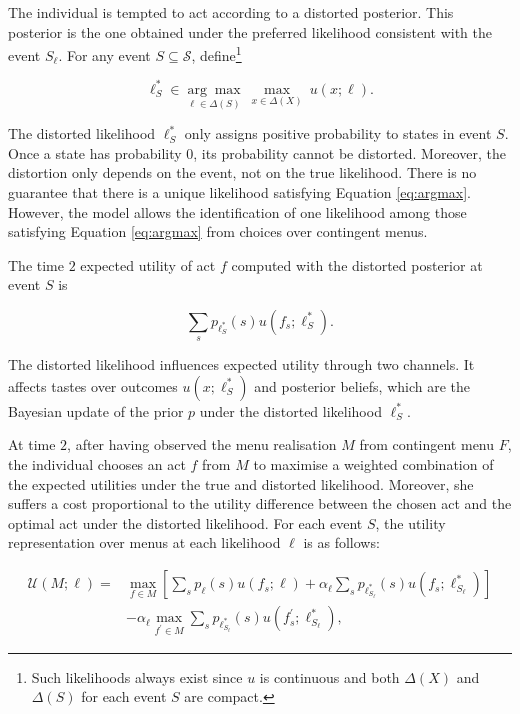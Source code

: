 The individual is tempted to act according to a distorted posterior. This posterior is the one obtained under the preferred likelihood consistent with the event \( S_{\ell} \). For any event \( S \subseteq \mathcal{S} \), define\footnote{Such likelihoods always exist since \( u \) is continuous and both \( \Delta \left( X \right) \) and \( \Delta \left( S \right) \) for each event \( S \) are compact.}

\begin{equation}\label{eq:argmax}
	\ell^{*}_{S} \in \underset{\ell \in \Delta \left( S \right)}{\arg \max} \: \max_{x \in \Delta \left( X \right)} \: u \left( x ; \ell \right) .
\end{equation}

The distorted likelihood \( \ell^{*}_{S} \) only assigns positive probability to states in event \( S \). Once a state has probability \( 0 \), its probability cannot be distorted. Moreover, the distortion only depends on the event, not on the true likelihood. There is no guarantee that there is a unique likelihood satisfying Equation \eqref{eq:argmax}. However, the model allows the identification of one likelihood among those satisfying Equation \eqref{eq:argmax} from choices over contingent menus.

The time \( 2 \) expected utility of act \( f \) computed with the distorted posterior at event \( S \) is

\[
	\sum_{s} p_{\ell^{*}_{S}} \left( s \right) u \left( f_{s} ; \ell^{*}_{S} \right) .
\]

The distorted likelihood influences expected utility through two channels. It affects tastes over outcomes \( u \left( x ; \ell^{*}_{S} \right) \) and posterior beliefs, which are the Bayesian update of the prior \( p \) under the distorted likelihood \( \ell^{*}_{S} \).

At time \( 2 \), after having observed the menu realisation \( M \) from contingent menu \( F \), the individual chooses an act \( f \) from \( M \) to maximise a weighted combination of the expected utilities under the true and distorted likelihood. Moreover, she suffers a cost proportional to the utility difference between the chosen act and the optimal act under the distorted likelihood. For each event \( S \), the utility representation over menus at each likelihood \( \ell \) is as follows:

\begin{equation}\label{eq:menu1}
	\begin{aligned}
		\mathcal{U} \left(M ; \ell \right) = & \max_{f \in M}\left[ \sum_{s} p_{\ell} \left( s \right) u \left( f_{s} ; \ell \right) +\alpha _{\ell} \sum_{s} p_{\ell^{*}_{S_{\ell}}} \left( s \right) u \left( f_{s} ; \ell^{*}_{S_{\ell}} \right) \right] \\
		                                     & - \alpha_{\ell} \max_{f^{\prime} \in M} \sum_{s} p_{\ell^{*}_{S_{\ell}}} \left( s \right) u\left(f^{\prime}_{s} ; \ell^{*}_{S_{\ell}} \right) ,
	\end{aligned}
\end{equation}


